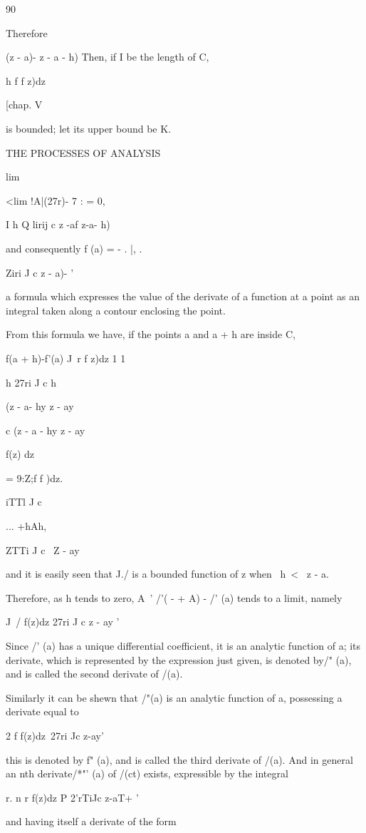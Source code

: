 {{90

Therefore

(z - a)- z - a - h) Then, if I be the length of C,

h f f z)dz

[chap. V

is bounded; let its upper bound be K.

THE PROCESSES OF ANALYSIS

lim

<lim !A|(27r)- 7 : = 0,

I h Q lirij c z -af z-a- h)

and consequently f (a) = - . |, .

   Ziri J c z - a)- '

a formula which expresses the value of the derivate of a function at a
point as an integral taken along a contour enclosing the point.

From this formula we have, if the points a and a + h are inside C,

f(a + h)-f'(a) J\ r f z)dz 1 1

h 27ri J c h

(z - a- hy z - ay

c (z - a - hy z - ay

f(z) dz

= 9:Z;f f )dz.

iTTl J c

... +hAh,

ZTTi J c \ Z - ay

and it is easily seen that J./ is a bounded function of z when \ h\ <
\ z - a.

Therefore, as h tends to zero, A~' /'( - + A) - /' (a) tends to a
limit, namely

J\ / f(z)dz 27ri J c z - ay '

Since /' (a) has a unique differential coefficient, it is an analytic
function of a; its derivate, which is represented by the expression
just given, is denoted by/" (a), and is called the second derivate of
/(a).

Similarly it can be shewn that /"(a) is an analytic function of a,
possessing a derivate equal to

2 f f(z)dz\ 27ri Jc z-ay'

this is denoted by f" (a), and is called the third derivate of /(a).
And in general an nth derivate/*"' (a) of /(ct) exists, expressible by
the integral

r. n r f(z)dz P 2'rTiJc z-aT+ '

and having itself a derivate of the form

}}
